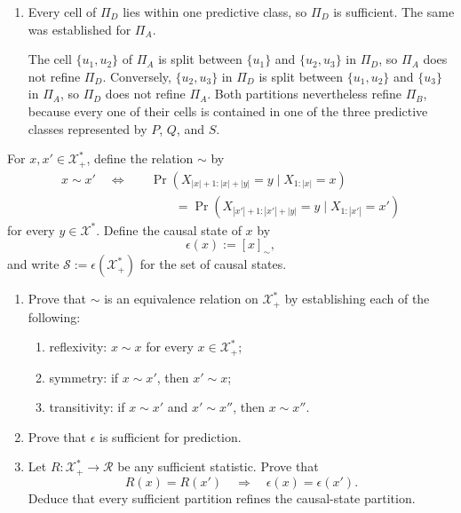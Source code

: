 \begin{solution}[ex:p2-1]
\begin{enumerate}
      \item Every cell of $\Pi_D$ lies within one predictive class, so $\Pi_D$
        is sufficient. The same was established for $\Pi_A$.

        The cell $\{u_1,u_2\}$ of $\Pi_A$ is split between $\{u_1\}$ and
        $\{u_2,u_3\}$ in $\Pi_D$, so $\Pi_A$ does not refine $\Pi_D$.
        Conversely, $\{u_2,u_3\}$ in $\Pi_D$ is split between
        $\{u_1,u_2\}$ and $\{u_3\}$ in $\Pi_A$, so $\Pi_D$ does not refine
        $\Pi_A$. Both partitions nevertheless refine $\Pi_B$, because every
        one of their cells is contained in one of the three predictive classes
        represented by $P$, $Q$, and $S$.
    \end{enumerate}
\end{solution}

\begin{exercise}
\label{ex:p2-2}
  For $x,x'\in\mathcal X_+^*$, define the relation $\sim$ by
  \[
    \begin{aligned}
    x\sim x'
    \quad\Longleftrightarrow\quad
    &\Pr\!\left(
      X_{|x|+1:|x|+|y|}=y\mid X_{1:|x|}=x
    \right)\\
    &\qquad=
    \Pr\!\left(
      X_{|x'|+1:|x'|+|y|}=y\mid X_{1:|x'|}=x'
    \right)
    \end{aligned}
  \]
  for every $y\in\mathcal X^*$. Define the causal state of $x$ by
  \[
    \epsilon(x):=[x]_{\sim},
  \]
  and write $\mathcal S:=\epsilon(\mathcal X_+^*)$ for the set of
  causal states.

  \begin{enumerate}
    \item Prove that $\sim$ is an equivalence relation on
      $\mathcal X_+^*$ by establishing each of the following:
      \begin{enumerate}
        \item reflexivity: $x\sim x$ for every $x\in\mathcal X_+^*$;
        \item symmetry: if $x\sim x'$, then $x'\sim x$;
        \item transitivity: if $x\sim x'$ and $x'\sim x''$, then
          $x\sim x''$.
      \end{enumerate}

    \item Prove that $\epsilon$ is sufficient for prediction.

    \item Let $R:\mathcal X_+^*\to\mathcal R$ be any sufficient statistic.
      Prove that
      \[
        R(x)=R(x')\quad\Longrightarrow\quad
        \epsilon(x)=\epsilon(x').
      \]
      Deduce that every sufficient partition refines the causal-state
      partition.


\end{enumerate}
\end{exercise}
